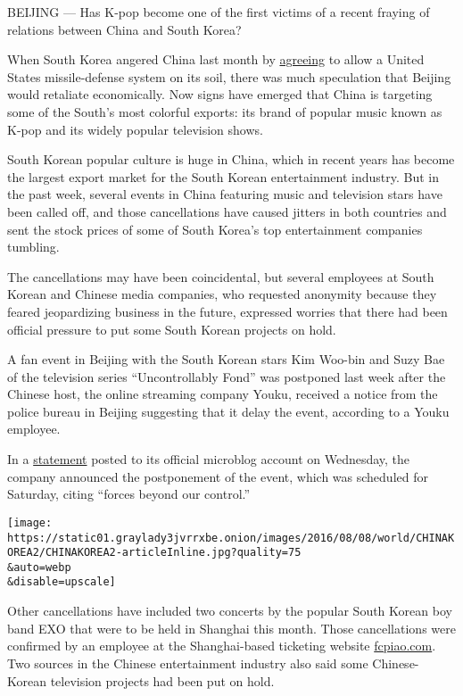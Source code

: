 BEIJING --- Has K-pop become one of the first victims of a recent
fraying of relations between China and South Korea?

When South Korea angered China last month by
\href{http://www.nytimes3xbfgragh.onion/2016/07/08/world/asia/south-korea-and-us-agree-to-deploy-missile-defense-system.html?_r=0}{agreeing}
to allow a United States missile-defense system on its soil, there was
much speculation that Beijing would retaliate economically. Now signs
have emerged that China is targeting some of the South's most colorful
exports: its brand of popular music known as K-pop and its widely
popular television shows.

South Korean popular culture is huge in China, which in recent years has
become the largest export market for the South Korean entertainment
industry. But in the past week, several events in China featuring music
and television stars have been called off, and those cancellations have
caused jitters in both countries and sent the stock prices of some of
South Korea's top entertainment companies tumbling.

The cancellations may have been coincidental, but several employees at
South Korean and Chinese media companies, who requested anonymity
because they feared jeopardizing business in the future, expressed
worries that there had been official pressure to put some South Korean
projects on hold.

A fan event in Beijing with the South Korean stars Kim Woo-bin and Suzy
Bae of the television series ``Uncontrollably Fond'' was postponed last
week after the Chinese host, the online streaming company Youku,
received a notice from the police bureau in Beijing suggesting that it
delay the event, according to a Youku employee.

In a
\href{http://weibo.com/1642904381/E1QOp4Dg4?from=page_1002061642904381_profile\&wvr=6\&mod=weibotime\&type=comment\#_rnd1470372650398}{statement}
posted to its official microblog account on Wednesday, the company
announced the postponement of the event, which was scheduled for
Saturday, citing ``forces beyond our control.''

\texttt{[image: https://static01.graylady3jvrrxbe.onion/images/2016/08/08/world/CHINAKOREA2/CHINAKOREA2-articleInline.jpg?quality=75\\\&auto=webp\\\&disable=upscale]}

Other cancellations have included two concerts by the popular South
Korean boy band EXO that were to be held in Shanghai this month. Those
cancellations were confirmed by an employee at the Shanghai-based
ticketing website \href{http://fcpiao.com/}{fcpiao.com}. Two sources in
the Chinese entertainment industry also said some Chinese-Korean
television projects had been put on hold.

